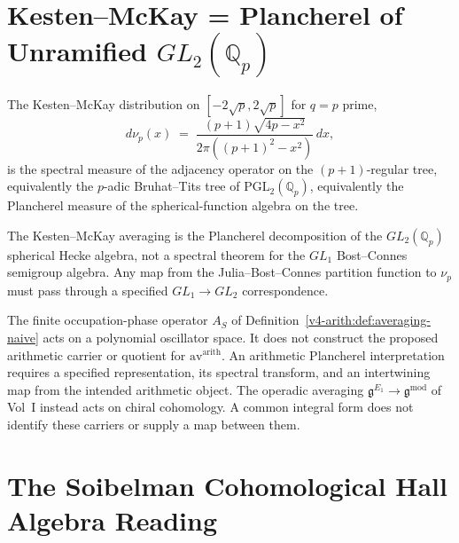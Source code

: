 \section{Kesten--McKay = Plancherel of Unramified \(GL_{2}(\mathbb{Q}_{p})\)}
\label{v4-arith:cs:kesten-mckay-plancherel}

\begin{theorem}
\label{v4-arith:thm:kesten-mckay-plancherel}
The Kesten--McKay distribution on
\([-2\sqrt{p},2\sqrt{p}]\) for \(q=p\) prime,
\begin{equation}
d\nu_{p}(x)\;=\;\frac{(p+1)\sqrt{4p-x^{2}}}{2\pi((p+1)^{2}-x^{2})}\,dx,
\end{equation}
is the spectral measure of the adjacency operator on the
\((p+1)\)-regular tree, equivalently the \(p\)-adic Bruhat--Tits tree
of \(\mathrm{PGL}_{2}(\mathbb{Q}_{p})\), equivalently the Plancherel
measure of the spherical-function algebra on the tree.
\end{theorem}

\begin{corollary}
\label{v4-arith:cor:kesten-mckay-is-local-hecke}
The Kesten--McKay averaging is the
Plancherel decomposition of the \(GL_{2}(\mathbb{Q}_{p})\) spherical
Hecke algebra, not a spectral theorem for the \(GL_{1}\) Bost--Connes
semigroup algebra. Any map from the Julia--Bost--Connes partition
function to \(\nu_{p}\) must pass through a specified \(GL_{1}\to GL_{2}\)
correspondence.
\end{corollary}

\begin{remark}
\label{v4-arith:rem:arithmetic-averaging-plancherel}
The finite occupation-phase operator \(A_S\) of
Definition~\ref{v4-arith:def:averaging-naive} acts on a polynomial oscillator
space. It does not construct the proposed arithmetic carrier or
quotient for \(\mathrm{av}^{\mathrm{arith}}\).
An arithmetic Plancherel interpretation requires a specified
representation, its spectral transform, and an intertwining map from
the intended arithmetic object. The operadic averaging
\(\mathfrak g^{E_1}\to\mathfrak g^{\mathrm{mod}}\) of Vol~I instead
acts on chiral cohomology. A common integral form does not identify
these carriers or supply a map between them.
\end{remark}

\section{The Soibelman Cohomological Hall Algebra Reading}
\label{v4-arith:cs:soibelman-coha}

